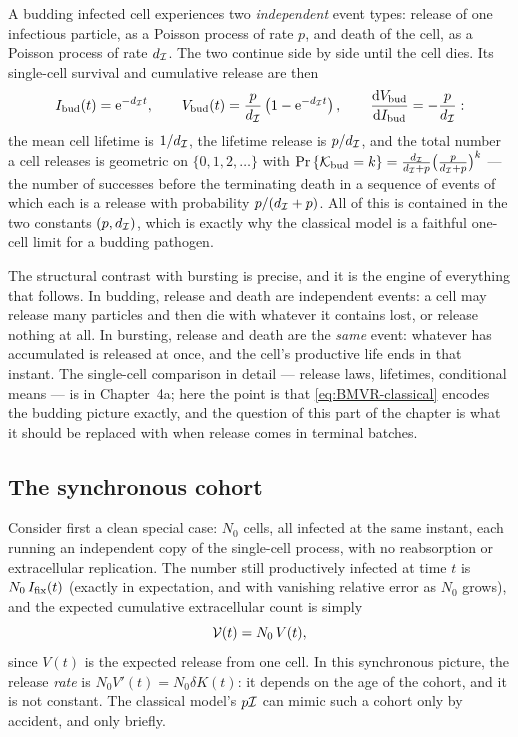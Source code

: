 A budding infected cell experiences two \emph{independent} event types:
release of one infectious particle, as a Poisson process of rate $p$, and
death of the cell, as a Poisson process of rate $d_{\mathcal{I}}$. The two
continue side by side until the cell dies. Its single-cell survival and
cumulative release are then
\begin{equation}
I_{\rm bud}(t)={\rm e}^{-d_{\mathcal{I}}t},\qquad
V_{\rm bud}(t)=\frac{p}{d_{\mathcal{I}}}\left(1-{\rm e}^{-d_{\mathcal{I}}t}\right),
\qquad
\displaystyle\frac{{\rm d} V_{\rm bud}}{{\rm d} I_{\rm bud}}=-\frac{p}{d_{\mathcal{I}}}:
\label{eq:bud-cell}
\end{equation}
the mean cell lifetime is $1/d_{\mathcal{I}}$, the lifetime release is
$p/d_{\mathcal{I}}$, and the total number a cell releases is geometric on
$\{0,1,2,\ldots\}$ with
${\text{Pr}\left\{\mathcal{K}_{\rm bud}=k\right\}}=\frac{d_{\mathcal{I}}}{d_{\mathcal{I}}+p}
\bigl(\frac{p}{d_{\mathcal{I}}+p}\bigr)^k$ --- the number of successes before
the terminating death in a sequence of events of which each is a release
with probability $p/(d_{\mathcal{I}}+p)$. All of this is contained in the two
constants $(p,d_{\mathcal{I}})$, which is exactly why the classical model is a
faithful one-cell limit for a budding pathogen.

The structural contrast with bursting is precise, and it is the engine of
everything that follows. In budding, release and death are independent
events: a cell may release many particles and then die with whatever it
contains lost, or release nothing at all. In bursting, release and death
are the \emph{same} event: whatever has accumulated is released at once,
and the cell's productive life ends in that instant. The single-cell
comparison in detail --- release laws, lifetimes, conditional means --- is
in Chapter~4a; here the point is that \eqref{eq:BMVR-classical} encodes the
budding picture exactly, and the question of this part of the chapter is
what it should be replaced with when release comes in terminal batches.

\subsection{The synchronous cohort}
\label{sec:sync-cohort}

Consider first a clean special case: $N_0$ cells, all infected at the same
instant, each running an independent copy of the single-cell process, with
no reabsorption or extracellular replication. The number still productively
infected at time $t$ is $N_0\,I_{\mathrm{fix}}(t)$ (exactly in expectation, and with
vanishing relative error as $N_0$ grows), and the expected cumulative
extracellular count is simply
\begin{equation}
\mathcal{V}(t)=N_0\,V(t),
\end{equation}
since $V(t)$ is the expected release from one cell. In this synchronous
picture, the release \emph{rate} is $N_0 V'(t)=N_0\delta K(t)$: it depends
on the age of the cohort, and it is not constant. The classical model's
$p\mathcal{I}$ can mimic such a cohort only by accident, and only briefly.

